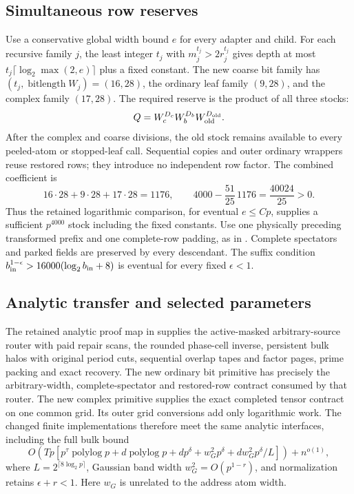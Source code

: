 \subsection{Simultaneous row reserves}
Use a conservative global width bound $e$ for every adapter and child.
For each recursive family $j$, the least integer $t_j$ with
$m_j^{t_j}>2r_j^{t_j}$ gives depth at most
$t_j\lceil\log_2\max(2,e)\rceil$ plus a fixed constant.
The new coarse bit family has $(t_j,\operatorname{bitlength}W_j)=(16,28)$,
the ordinary leaf family $(9,28)$, and the complex family $(17,28)$.
The required reserve is the product of all three stocks:
\[
 Q=W_c^{D_c}W_b^{D_b}W_{\rm old}^{D_{\rm old}}.
\]
After the complex and coarse divisions, the old stock remains available
to every peeled-atom or stopped-leaf call. Sequential copies and outer
ordinary wrappers reuse restored rows; they introduce no independent
row factor. The combined coefficient is
\[
 16\cdot28+9\cdot28+17\cdot28=1176,
 \qquad4000-\frac{51}{25}\,1176=\frac{40024}{25}>0.
\]
Thus the retained logarithmic comparison, for eventual $e\le Cp$,
supplies a sufficient $p^{4000}$ stock including the fixed constants.
Use one physically preceding transformed prefix and one complete-row
padding, as in . Complete
spectators and parked fields are preserved by every descendant.
The suffix condition
$b_{\rm in}^{1-\epsilon}>16000(\log_2b_{\rm in}+8)$ is eventual
for every fixed $\epsilon<1$.

\subsection{Analytic transfer and selected parameters}
The retained analytic proof map in
 supplies the active-masked
arbitrary-source router with paid repair scans, the rounded phase-cell
inverse, persistent bulk halos with original period cuts, sequential
overlap tapes and factor pages, prime packing and exact recovery.
The new ordinary bit primitive has precisely the arbitrary-width,
complete-spectator and restored-row contract consumed by that router.
The new complex primitive supplies the exact completed tensor contract
on one common grid. Its outer grid conversions add only logarithmic
work. The changed finite implementations therefore meet the same
analytic interfaces, including the full bulk bound
\[
 O\!\left(Tp\left[p^\tau\operatorname{polylog}p+
 d\operatorname{polylog}p+dp^\delta+w_G^2p^\delta+
 dw_G^2p^\delta/L\right]\right)+n^{o(1)},
\]
where $L=2^{\lceil8\log_2p\rceil}$, Gaussian band width
$w_G^2=O(p^{1-r})$, and normalization retains $\epsilon+r<1$.
Here $w_G$ is unrelated to the address atom width.

